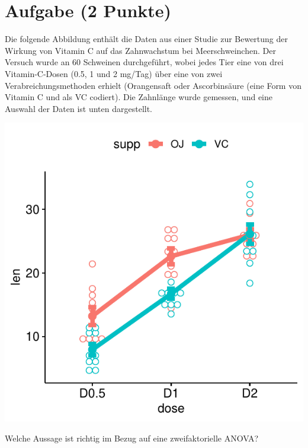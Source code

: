 \documentclass[a4paper, 10pt]{scrartcl}\usepackage[]{graphicx}\usepackage[]{color}
\makeatletter
\def\maxwidth{ %
  \ifdim\Gin@nat@width>\linewidth
    \linewidth
  \else
    \Gin@nat@width
  \fi
}
\makeatother
\begin{document}
\section{Aufgabe \hfill (2 Punkte)}

Die folgende Abbildung enth{\"a}lt die Daten aus einer Studie zur
Bewertung der Wirkung von Vitamin C auf das Zahnwachstum bei
Meerschweinchen. Der Versuch wurde an 60 Schweinen durchgef{\"u}hrt, wobei
jedes Tier eine von drei Vitamin-C-Dosen (0.5, 1 und 2 mg/Tag) {\"u}ber eine
von zwei Verabreichungsmethoden erhielt (Orangensaft oder Ascorbins{\"a}ure
(eine Form von Vitamin C und als VC codiert). Die Zahnl{\"a}nge wurde gemessen,
und eine Auswahl der Daten ist unten dargestellt.



{\centering \includegraphics[width=\maxwidth]{img/mc-anova-02-a-1} 

}




Welche Aussage ist richtig im Bezug auf eine zweifaktorielle ANOVA?
\end{document}
